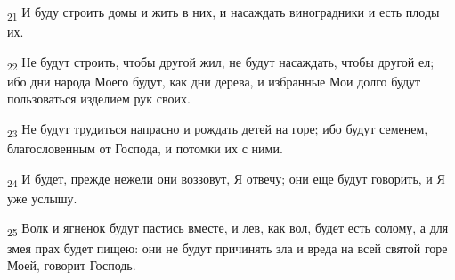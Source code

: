 \begin{tcolorbox}
\textsubscript{21} И буду строить домы и жить в них, и насаждать виноградники и есть плоды их.
\end{tcolorbox}
\begin{tcolorbox}
\textsubscript{22} Не будут строить, чтобы другой жил, не будут насаждать, чтобы другой ел; ибо дни народа Моего будут, как дни дерева, и избранные Мои долго будут пользоваться изделием рук своих.
\end{tcolorbox}
\begin{tcolorbox}
\textsubscript{23} Не будут трудиться напрасно и рождать детей на горе; ибо будут семенем, благословенным от Господа, и потомки их с ними.
\end{tcolorbox}
\begin{tcolorbox}
\textsubscript{24} И будет, прежде нежели они воззовут, Я отвечу; они еще будут говорить, и Я уже услышу.
\end{tcolorbox}
\begin{tcolorbox}
\textsubscript{25} Волк и ягненок будут пастись вместе, и лев, как вол, будет есть солому, а для змея прах будет пищею: они не будут причинять зла и вреда на всей святой горе Моей, говорит Господь.
\end{tcolorbox}
